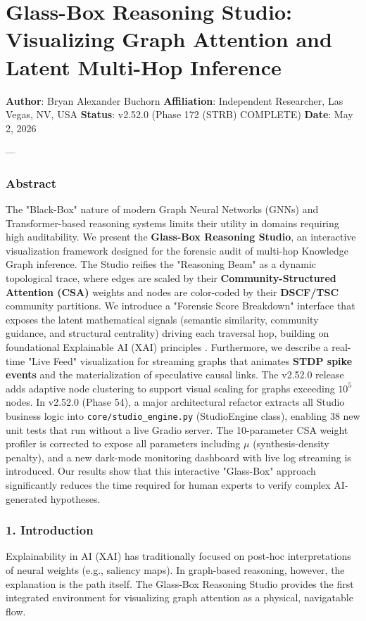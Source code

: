 \section{Glass-Box Reasoning Studio: Visualizing Graph Attention and Latent Multi-Hop Inference}

\textbf{Author}: Bryan Alexander Buchorn  
\textbf{Affiliation}: Independent Researcher, Las Vegas, NV, USA  
\textbf{Status}: v2.52.0 (Phase 172 (STRB) COMPLETE)
\textbf{Date}: May 2, 2026

---

\subsubsection{Abstract}
The "Black-Box" nature of modern Graph Neural Networks (GNNs) and Transformer-based reasoning systems limits their utility in domains requiring high audit\-ability. We present the \textbf{Glass-Box Reasoning Studio}, an interactive visua\-lization framework designed for the forensic audit of multi-hop Knowledge Graph inference. The Studio reifies the "Reasoning Beam" as a dynamic topological trace, where edges are scaled by their \textbf{Community-Structured Attention (CSA)} weights and nodes are color-coded by their \textbf{DSCF/TSC} community partitions. We introduce a "Forensic Score Breakdown" interface that exposes the latent mathe\-matical signals (semantic similarity, community guidance, and structural centrality) driving each traversal hop, building on found\-ational Explainable AI (XAI) principles \cite{samek2017explainable, ribeiro2016lime, lundberg2017shap}. Furthermore, we describe a real-time "Live Feed" visua\-lization for streaming graphs that animates \textbf{STDP spike events} and the mater\-ialization of speculative causal links. The v2.52.0 release adds adaptive node clustering to support visual scaling for graphs exceeding $10^5$ nodes. In v2.52.0 (Phase 54), a major archi\-tectural refactor extracts all Studio business logic into \texttt{core/studio\_engine.py} (StudioEngine class), enabling 38 new unit tests that run without a live Gradio server. The 10-parameter CSA weight profiler is corrected to expose all parameters including $\mu$ (synthesis-density penalty), and a new dark-mode monitoring dashboard with live log streaming is introduced. Our results show that this interactive "Glass-Box" approach signi\-ficantly reduces the time required for human experts to verify complex AI-generated hypotheses.

\subsubsection{1. Introd\-uction}
Explai\-nability in AI (XAI) has tradi\-tionally focused on post-hoc inter\-pretations of neural weights (e.g., saliency maps). In graph-based reasoning, however, the explanation is the path itself. The Glass-Box Reasoning Studio provides the first integrated environment for visualizing graph attention as a physical, navigatable flow.

